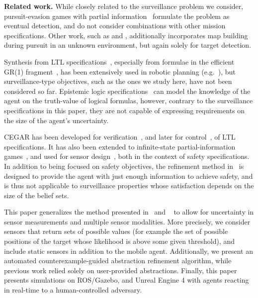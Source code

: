 {\bf Related work.}
While closely related to the surveillance problem we consider, pursuit-evasion games with partial information~\cite{Chung2011, Chin2010, Antoniades2003} formulate the problem as eventual detection, and do not consider combinations with other mission specifications. Other work, such as \cite{Vidal2002} and \cite{Kim2001}, additionally incorporates map building during pursuit in an unknown environment, but again solely for target detection.

Synthesis from LTL specifications~\cite{Pnueli1989}, especially from formulae in the efficient GR(1) fragment~\cite{Piterman2006}, has been extensively used in robotic planning (e.g.~\cite{wong2012,Kress2007}), but surveillance-type objectives, such as the ones we study here, have not been considered so far. Epistemic logic specifications~\cite{MeydenV98} can model the knowledge of the agent on the truth-value of logical formulas, however, contrary to the surveillance specifications in this paper, they are not capable of expressing requirements on the size of the agent's uncertainty.

CEGAR has been developed for verification~\cite{ClarkeGJLV00}, and later for control~\cite{HenzingerJM03}, of LTL specifications. 
It has also been extended to infinite-state partial-information games~\cite{DimitrovaF08}, and used for sensor design~\cite{FuDT14}, both in the context of safety specifications. In addition to being focused on safety objectives, the refinement method in~\cite{DimitrovaF08} is designed to provide the agent with just enough information to achieve safety, and is thus not applicable to surveillance properties whose satisfaction depends on the size of the belief sets.

This paper generalizes the method presented in~\cite{bharadwaj2018synthesis} and ~\cite{bharadwaj2018distributed} to allow for uncertainty in sensor measurements and multiple sensor modalities. More precisely, we consider sensors that return sets of possible values (for example the set of possible positions of the target whose likelihood is above some given threshold), and include static sensors in addition to the mobile agent. Additionally, we present an automated counterexample-guided abstraction refinement algorithm, while previous work relied solely on user-provided abstractions. Finally, this paper presents simulations on ROS/Gazebo, and Unreal Engine 4 with agents reacting in real-time to a human-controlled adversary.

